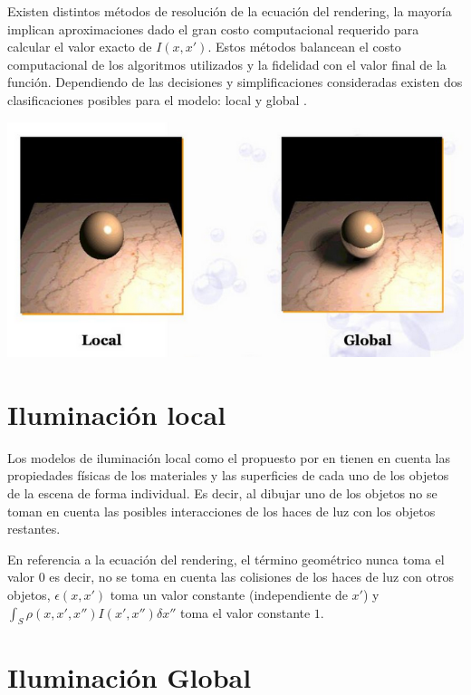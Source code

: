 Existen distintos métodos de resolución de la ecuación del rendering, la mayoría implican aproximaciones dado el gran costo 
computacional requerido para calcular el valor exacto de $I(x,x')$. Estos métodos balancean el costo computacional de los algoritmos
utilizados y la fidelidad con el valor final de la función. Dependiendo de las decisiones y simplificaciones consideradas
existen dos clasificaciones posibles para el modelo: local y global \label{local-vs-global-img}.

\begin{minipage}[h]{0.8\linewidth}
    \includegraphics[width=\linewidth]{assets/local_vs_global}
    \label{local-vs-global-img}
\end{minipage}

\section{Iluminación local}
\label{sec:ilumlocal}
Los modelos de iluminación local como el propuesto por \citeauthor{Phong} en \citeyear{Phong} tienen en cuenta las propiedades físicas de los materiales
y las superficies de cada uno de los objetos de la escena de forma individual. Es decir, al dibujar uno de los
objetos no se toman en cuenta las posibles interacciones de los haces de luz con los objetos restantes.

En referencia a la ecuación del rendering, el término
geométrico nunca toma el valor 0 es decir, no se toma en cuenta las colisiones de los haces de luz con otros
objetos, $\epsilon(x,x')$ toma un valor constante (independiente de $x'$) y $\int_{S} \rho(x,x',x'')I(x',x'') \delta x''$ toma el valor constante $1$.

\section{Iluminación Global}
\label{sec:ilumglobal}

